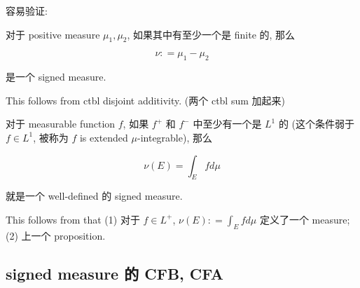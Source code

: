 \documentclass{qlnotes-export}
\begin{document}
\begin{example}\label{ex-10-signed-measure-jordan-decomposition-example-001}

容易验证:

\begin{proposition}\label{prop-10-signed-measure-jordan-decomposition-proposition-001}

对于 positive measure \(\mu_{1},\mu_{2}\), 如果其中有至少一个是 finite 的, 那么

\[\nu: = \mu_{1} - \mu_{2}\]

是一个 signed measure.

\end{proposition}

This follows from ctbl disjoint additivity. (两个 ctbl sum 加起来)

\end{example}

\begin{example}\label{ex-10-signed-measure-jordan-decomposition-example-002}

\begin{proposition}\label{prop-10-signed-measure-jordan-decomposition-proposition-002}

对于 measurable function \(f\), 如果 \(f^{+}\) 和 \(f^{-}\) 中至少有一个是 \(L^{1}\) 的 (这个条件弱于 \(f \in L^{1}\), 被称为 \(f\) is extended \(\mu\)-integrable), 那么

\[\nu(E) = \int_{E}f d\mu\]

就是一个 well-defined 的 signed measure.

\end{proposition}

This follows from that (1) 对于 \(f \in L^{+}\), \(\nu(E): = \int_{E}f d\mu\) 定义了一个 measure; (2) 上一个 proposition.

\end{example}

\subsection{signed measure 的 CFB, CFA}\label{signed-measure-ux7684-cfb-cfa}
\end{document}
